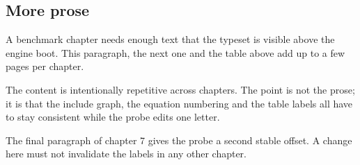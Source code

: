 \subsection{More prose}
A benchmark chapter needs enough text that the type\-set is visible above the
engine boot. This paragraph, the next one and the table above add up to a few
pages per chapter.

The content is intentionally repetitive across chapters. The point is not the
prose; it is that the include graph, the equation numbering and the table
labels all have to stay consistent while the probe edits one letter.

The final paragraph of chapter 7 gives the probe a second stable offset. A
change here must not invalidate the labels in any other chapter.
